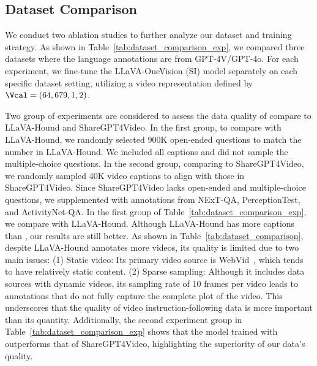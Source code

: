 \subsection{Dataset Comparison}
\label{sec;subsec:dataset_comparison}
We conduct two ablation studies to further analyze our dataset and training strategy. As shown in Table~\ref{tab:dataset_comparison_exp}, we compared three datasets where the language annotations are from GPT-4V/GPT-4o. For each experiment, we fine-tune the LLaVA-OneVision (SI) model separately on each specific dataset setting, utilizing a video representation defined by $\Vcal = (64, 679, 1, 2)$.

Two group of experiments are considered to assess the data quality of \DataName{} compare to LLaVA-Hound and ShareGPT4Video. In the first group, to compare \DataName{} with LLaVA-Hound, we randomly selected 900K open-ended questions to match the number in LLaVA-Hound. We included all captions and did not sample the multiple-choice questions. In the second group, comparing \DataName{} to ShareGPT4Video, we randomly sampled 40K video captions to align with those in ShareGPT4Video. Since ShareGPT4Video lacks open-ended and multiple-choice questions, we supplemented with annotations from NExT-QA, PerceptionTest, and ActivityNet-QA. 
In the first group of Table~\ref{tab:dataset_comparison_exp}, we compare \DataName{} with LLaVA-Hound. Although LLaVA-Hound has more captions than \DataName{}, our results are still better. As shown in Table~\ref{tab:dataset_comparison}, despite LLaVA-Hound annotates more videos, its quality is limited due to two main issues: (1) Static video: Its primary video source is WebVid~\citep{Bain21}, which tends to have relatively static content. (2) Sparse sampling: Although it includes data sources with dynamic videos, its sampling rate of 10 frames per video leads to annotations that do not fully capture the complete plot of the video. This underscores that the quality of video instruction-following data is more important than its quantity. Additionally, the second experiment group in Table~\ref{tab:dataset_comparison_exp} shows that the model trained with \DataName{} outperforms that of ShareGPT4Video,  highlighting the superiority of our data's quality.

